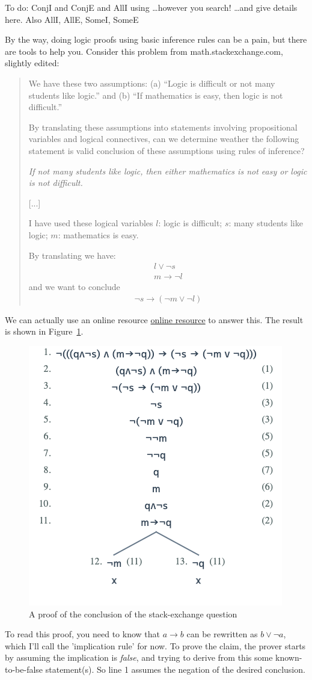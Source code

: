 To do: ConjI and ConjE and AllI using \ldots however you search! \ldots  and give details here. Also AllI, AllE, SomeI, SomeE

By the way, doing logic proofs using basic inference rules can be a pain, but there are tools to help you. Consider this problem from math.stackexchange.com, slightly edited:


\begin{quote}   
We have these two assumptions: (a) “Logic is difficult or not many students like logic.” and (b) “If mathematics is easy, then logic is not difficult.”

By translating these assumptions into statements involving propositional variables and logical connectives, can we determine weather the following statement is valid conclusion of these assumptions using rules of inference?

\emph{If not many students like logic, then either mathematics is not easy or logic is not difficult.}

[...]

I have used these logical variables
$l$: logic is difficult; $s$: many students like logic; 
$m$: mathematics is easy.

By translating we have:
\begin{align}
l \vee \neg s \\
m \to \neg l
\end{align}
and we want to conclude 
\begin{align}
\neg s \to (\neg m \vee \neg l)
\end{align}
\end{quote}
We can actually use an online resource \href{https://www.umsu.de/trees/#(q~1(~3s))~1(m~5(~3q))~5((~3s)~5((~3m)~2(~3q)))}{online resource} to answer this. The result is shown in Figure~\ref{fig:logic-proof}.

\begin{figure}[ht]
    \centering
    \includegraphics[width=0.5\linewidth]{TEXT//C03//Images/logic-proof.png}
    \caption{A proof of the conclusion of the stack-exchange question}
    \label{fig:logic-proof}
\end{figure}
To read this proof, you need to know that $a \to b$ can be rewritten as $b \vee \neg a$, which I'll call the 'implication rule' for now. To prove the claim, the prover starts by assuming the implication is \textit{false}, and trying to derive from this some known-to-be-false statement(s). So line 1 assumes the negation of the desired conclusion. 

